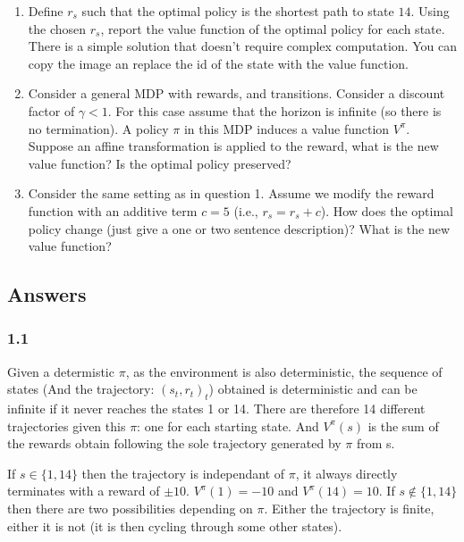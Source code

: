 \documentclass[a4paper]{article}
\begin{document}
\begin{enumerate}
    \item Define $r_s$ such that the optimal policy is the shortest path to state $14$. Using the chosen $r_s$, report the value function of the optimal policy for each state.\\
          There is a simple solution that doesn't require complex computation. You can copy the image an replace the id of the state with the value function.

    \item Consider a general MDP with rewards, and transitions. Consider a discount factor of $\gamma < 1$.
          For this case assume that the horizon is infinite (so there is no termination). A policy $\pi$ in
          this MDP induces a value function $V^\pi$.
          Suppose an affine transformation is applied to the reward, what is the new value function? Is the optimal policy preserved?

    \item Consider the same setting as in question 1. Assume we modify the reward function with an additive term $c = 5$ (i.e., $r_s = r_s + c$). How does the optimal policy change (just
          give a one or two sentence description)? What is the new value function?

\end{enumerate}

\subsection*{Answers}
\subsubsection*{1.1}

Given a determistic $\pi$, as the environment is also deterministic, the sequence of states (And the trajectory: $(s_t, r_t)_t$) obtained is
deterministic and can be infinite if it never reaches the states 1 or 14. There are therefore 14 different trajectories given this $\pi$: one
for each starting state. And $V^\pi(s)$ is the sum of the rewards obtain following the sole trajectory generated by $\pi$ from s.

If $s \in \{1, 14\}$ then the trajectory is independant of $\pi$, it always directly terminates with a reward of $\pm 10$. $V^\pi(1) = -10$ and $V^\pi(14) = 10$.
If $s \notin \{1, 14\}$ then there are two possibilities depending on $\pi$. Either the trajectory is finite, either it is not
(it is then cycling through some other states).
\end{document}
